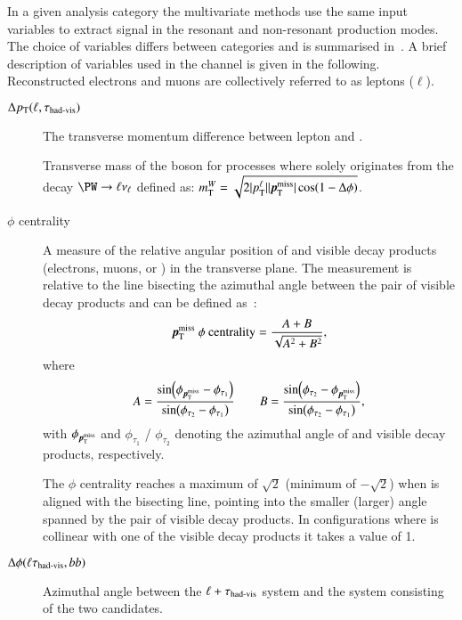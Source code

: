 In a given analysis category the multivariate methods use the same
input variables to extract \HH signal in the resonant and non-resonant
production modes. The choice of variables differs between categories
and is summarised in~. A brief description of
variables used in the \lephad channel is given in the following.
Reconstructed electrons and muons are collectively referred to as
leptons ($\ell$).
\begin{description}

\item[$\Delta p_{\text{T}}(\ell, \tau_{\text{had-vis}})$] The transverse momentum
  difference between lepton and \tauhadvis.

\item[\mTW] Transverse mass of the \PW boson for processes where
  \pTmiss solely originates from the decay $\PW \ra \ell \nu_\ell$ defined as:
  $\mTW = \sqrt{2 |\pT^{\ell}| |\pTmiss| \cos(1 - \Delta\phi)}$.

\item[\pTmiss $\phi$ centrality] A measure of the relative angular
  position of \pTmiss and visible \taulepton decay products
  (electrons, muons, or \tauhadvis) in the transverse plane. The
  measurement is relative to the line bisecting the azimuthal angle
  between the pair of visible \taulepton decay products and can be
  defined as~\cite{HIGG-2013-32, HIGG-2016-16-witherratum}:
  \begin{align*}
    \pTmiss\text{ }\phi\text{ centrality} = \frac{A + B}{\sqrt{A^2 + B^2}} \text{,}
  \end{align*}
  where
  \begin{align*}
    A = \frac{\sin(\phi_{\pTmiss} - \phi_{\tau_1})}{\sin(\phi_{\tau_2} - \phi_{\tau_1})} \qquad B = \frac{\sin(\phi_{\tau_2} - \phi_{\pTmiss})}{\sin(\phi_{\tau_2} - \phi_{\tau_1})} \text{,}
  \end{align*}
  with $\phi_{\pTmiss}$ and $\phi_{\tau_1}$ / $\phi_{\tau_2}$ denoting
  the azimuthal angle of \pTmiss and visible \taulepton decay
  products, respectively.

  The \pTmiss $\phi$ centrality reaches a maximum of $\sqrt{2}$
  (minimum of $-\sqrt{2}$) when \pTmiss is aligned with the bisecting
  line, pointing into the smaller (larger) angle spanned by the pair
  of visible \taulepton decay products. In configurations where
  \pTmiss is collinear with one of the visible \taulepton decay
  products it takes a value of 1.

\item[$\Delta\phi(\ell\tau_{\text{had-vis}}, bb)$] Azimuthal angle between the
  $\ell + \tau_{\text{had-vis}}$ system and the system consisting of the two
  \bjet candidates.


\end{description}
